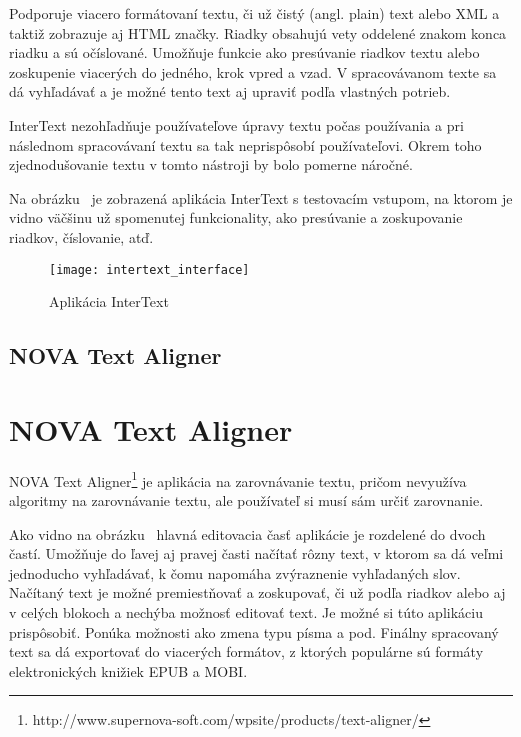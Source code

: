 Podporuje viacero formátovaní textu, či už čistý (angl. plain) text alebo XML a taktiž zobrazuje aj HTML značky. Riadky obsahujú vety oddelené znakom konca riadku a sú očíslované. Umožňuje funkcie ako presúvanie riadkov textu alebo zoskupenie viacerých do jedného, krok vpred a vzad. V spracovávanom texte sa dá vyhľadávať a je možné tento text aj upraviť podľa vlastných potrieb.

InterText nezohľadňuje používateľove úpravy textu počas používania a pri následnom spracovávaní textu sa tak neprispôsobí používateľovi. Okrem toho zjednodušovanie textu v tomto nástroji by bolo pomerne náročné.

Na obrázku~ je zobrazená aplikácia InterText s testovacím vstupom, na ktorom je vidno väčšinu už spomenutej funkcionality, ako presúvanie a zoskupovanie riadkov, číslovanie, atď.

\begin{figure}[H]
	\begin{center}\texttt{[image: intertext\_interface]}\end{center}
	\caption[Aplikácia InterText]{Aplikácia InterText}\label{fig:intertext_interface}
\end{figure}

%
%
{
	\subsection{NOVA Text Aligner}
}
{
	\section{NOVA Text Aligner}
}
NOVA Text Aligner\footnote{http://www.supernova-soft.com/wpsite/products/text-aligner/} je aplikácia na zarovnávanie textu, pričom nevyužíva algoritmy na zarovnávanie textu, ale používateľ si musí sám určiť zarovnanie.

Ako vidno na obrázku~ hlavná editovacia časť aplikácie je rozdelené do dvoch častí. Umožňuje do ľavej aj pravej časti načítať rôzny text, v ktorom sa dá veľmi jednoducho vyhľadávať, k čomu napomáha zvýraznenie vyhľadaných slov. Načítaný text je možné premiestňovať a zoskupovať, či už podľa riadkov alebo aj v celých blokoch a nechýba možnosť editovať text. Je možné si túto aplikáciu prispôsobiť. Ponúka možnosti ako zmena typu písma a pod. Finálny spracovaný text sa dá exportovať do viacerých formátov, z ktorých populárne sú formáty elektronických knižiek EPUB a MOBI.

